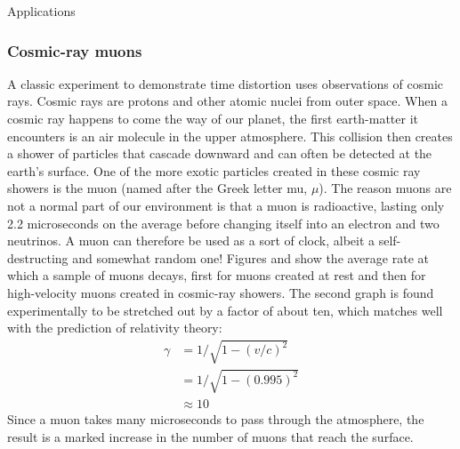 \begin{envsubsection}{Applications}
\subsubsection{Cosmic-ray muons}
A classic experiment to demonstrate time distortion uses
observations of cosmic rays.
Cosmic rays are protons and other atomic nuclei from outer
space. When a cosmic ray happens to come the way of our
planet, the first earth-matter it encounters is an air
molecule in the upper atmosphere. This collision then
creates a shower of particles that cascade downward and can
often be detected at the earth's surface. One of the more
exotic particles created in these cosmic ray showers is the
muon (named after the Greek letter mu, $\mu$). The reason muons
are not a normal part of our environment is that a muon is
radioactive, lasting only 2.2 microseconds on the average
before changing itself into an electron and two neutrinos. A
muon can therefore be used as a sort of clock, albeit a
self-destructing and somewhat random one! Figures  and 
show the average rate at which a sample of muons decays,
first for muons created at rest and then for high-velocity
muons created in cosmic-ray showers. The second graph is
found experimentally to be stretched out by a factor of
about ten, which matches well with the prediction of
relativity theory:
\begin{align*}
	\gamma	&= 1/\sqrt{1-(v/c)^2} \\
			&= 1/\sqrt{1-(0.995)^2} \\
 			&\approx 10
\end{align*}
Since a muon takes many microseconds to pass through the
atmosphere, the result is a marked increase in the number of
muons that reach the surface.




\end{envsubsection}
